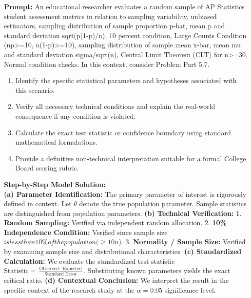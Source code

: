 \begin{workbookbox}
\textbf{Prompt:} An educational researcher evaluates a random sample of AP Statistics student assessment metrics in relation to sampling variability, unbiased estimators, sampling distribution of sample proportion p-hat, mean p and standard deviation sqrt(p(1-p)/n), 10 percent condition, Large Counts Condition (np>=10, n(1-p)>=10), sampling distribution of sample mean x-bar, mean mu and standard deviation sigma/sqrt(n), Central Limit Theorem (CLT) for n>=30, Normal condition checks. In this context, consider Problem Part 5.7.
\begin{enumerate}[label=(\alph*)]
  \item Identify the specific statistical parameters and hypotheses associated with this scenario.
  \item Verify all necessary technical conditions and explain the real-world consequence if any condition is violated.
  \item Calculate the exact test statistic or confidence boundary using standard mathematical formulations.
  \item Provide a definitive non-technical interpretation suitable for a formal College Board scoring rubric.
\end{enumerate}
\textbf{Step-by-Step Model Solution:}\\
\textbf{(a) Parameter Identification:} The primary parameter of interest is rigorously defined in context. Let $\theta$ denote the true population parameter. Sample statistics are distinguished from population parameters.
\textbf{(b) Technical Verification:} 1. \textbf{Random Sampling:} Verified via independent random allocation. 2. \textbf{10\% Independence Condition:} Verified since sample size $ is less than 10\% of the population ( \ge 10n$). 3. \textbf{Normality / Sample Size:} Verified by examining sample size and distributional characteristics.
\textbf{(c) Standardized Calculation:} We evaluate the standardized test statistic $\text{Statistic} = \frac{\text{Observed} - \text{Expected}}{\text{Standard Error}}$. Substituting known parameters yields the exact critical ratio.
\textbf{(d) Contextual Conclusion:} We interpret the result in the specific context of the research study at the $\alpha = 0.05$ significance level.
\end{workbookbox}\vspace{6pt}
